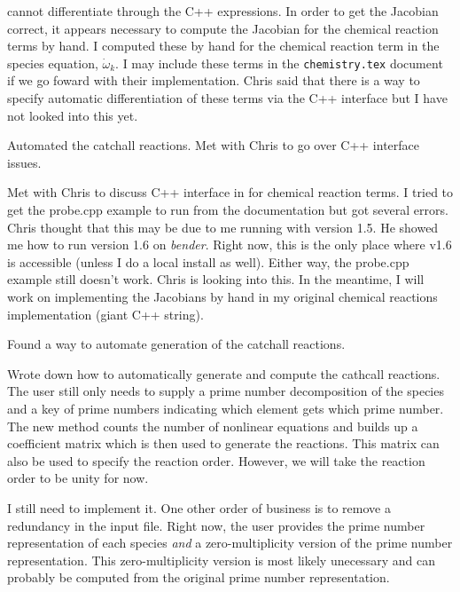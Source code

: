 \fenics cannot differentiate through the C++ expressions.  In order to get the Jacobian correct, it appears necessary to compute the Jacobian for the chemical reaction terms by hand.  I computed these by hand for the chemical reaction term in the species equation, $\dot\omega_{k}$.  I may include these terms in the \texttt{chemistry.tex} document if we go foward with their implementation.  Chris said that there is a way to specify automatic differentiation of these terms via the C++ interface but I have not looked into this yet.


Automated the catchall reactions.  Met with Chris to go over \fenics C++ interface issues.


Met with Chris to discuss C++ interface in \fenics for chemical reaction terms.  I tried to get the probe.cpp example to run from the \fenics documentation but got several errors.  Chris thought that this may be due to me running with \fenics version 1.5.  He showed me how to run \fenics version 1.6 on \textit{bender}.  Right now, this is the only place where \fenics v1.6 is accessible (unless I do a local install as well).  Either way, the probe.cpp example still doesn't work.  Chris is looking into this.  In the meantime, I will work on implementing the Jacobians by hand in my original chemical reactions implementation (giant C++ string).

Found a way to automate generation of the catchall reactions.

Wrote down how to automatically generate and compute the cathcall reactions.  The user still only needs to supply a prime number decomposition of the species and a key of prime numbers indicating which element gets which prime number.  The new method counts the number of nonlinear equations and builds up a coefficient matrix which is then used to generate the reactions.  This matrix can also be used to specify the reaction order.  However, we will take the reaction order to be unity for now.

I still need to implement it.  One other order of business is to remove a redundancy in the input file.  Right now, the user provides the prime number representation of each species \textit{and} a zero-multiplicity version of the prime number representation.  This zero-multiplicity version is most likely unecessary and can probably be computed from the original prime number representation.

